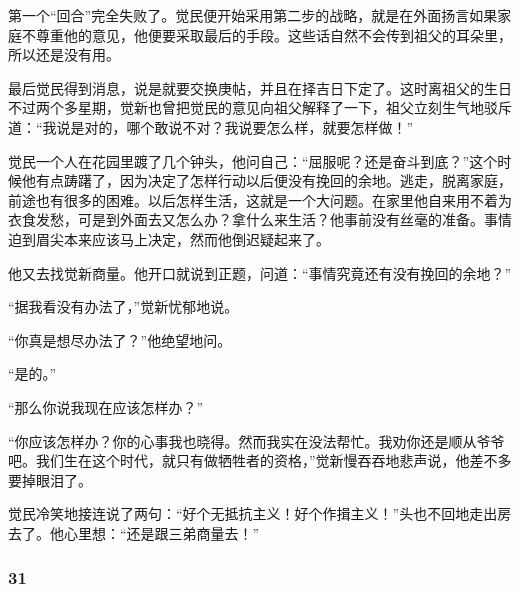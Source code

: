 \par 第一个“回合”完全失败了。觉民便开始采用第二步的战略，就是在外面扬言如果家庭不尊重他的意见，他便要采取最后的手段。这些话自然不会传到祖父的耳朵里，所以还是没有用。
\par 最后觉民得到消息，说是就要交换庚帖，并且在择吉日下定了。这时离祖父的生日不过两个多星期，觉新也曾把觉民的意见向祖父解释了一下，祖父立刻生气地驳斥道：“我说是对的，哪个敢说不对？我说要怎么样，就要怎样做！”
\par 觉民一个人在花园里踱了几个钟头，他问自己：“屈服呢？还是奋斗到底？”这个时候他有点踌躇了，因为决定了怎样行动以后便没有挽回的余地。逃走，脱离家庭，前途也有很多的困难。以后怎样生活，这就是一个大问题。在家里他自来用不着为衣食发愁，可是到外面去又怎么办？拿什么来生活？他事前没有丝毫的准备。事情迫到眉尖本来应该马上决定，然而他倒迟疑起来了。
\par 他又去找觉新商量。他开口就说到正题，问道：“事情究竟还有没有挽回的余地？”
\par “据我看没有办法了，”觉新忧郁地说。
\par “你真是想尽办法了？”他绝望地问。
\par “是的。”
\par “那么你说我现在应该怎样办？”
\par “你应该怎样办？你的心事我也晓得。然而我实在没法帮忙。我劝你还是顺从爷爷吧。我们生在这个时代，就只有做牺牲者的资格，”觉新慢吞吞地悲声说，他差不多要掉眼泪了。
\par 觉民冷笑地接连说了两句：“好个无抵抗主义！好个作揖主义！”头也不回地走出房去了。他心里想：“还是跟三弟商量去！”



\subsubsection*{31}


